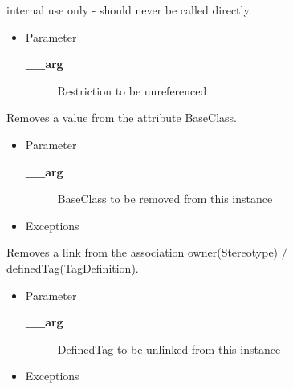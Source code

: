 \begin{desc}internal use only - should never be called directly.
\begin{itemize}
\item{Parameter
  \begin{description}
   \item[{\bf \_\_arg}]{Restriction to be unreferenced}
  \end{description}}
\end{itemize}
\end{desc}

\begin{desc}Removes a value from the attribute BaseClass.
\begin{itemize}
\item{Parameter
  \begin{description}
   \item[{\bf \_\_arg}]{BaseClass to be removed from this instance}
  \end{description}}
\end{itemize}
\begin{itemize}
\item{{Exceptions}
}
\end{itemize}
\end{desc}

\begin{desc}Removes a link from the association owner(Stereotype)
  $/$ definedTag(TagDefinition).
\begin{itemize}
\item{Parameter
  \begin{description}
   \item[{\bf \_\_arg}]{DefinedTag to be unlinked from this instance}
  \end{description}}
\end{itemize}
\begin{itemize}
\item{{Exceptions}
}
\end{itemize}
\end{desc}

